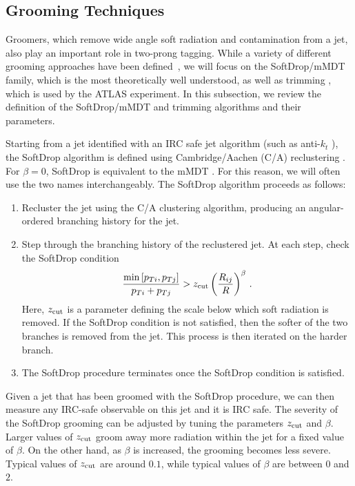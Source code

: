 \documentclass[11pt]{cernrep}
\begin{document}
\subsection{Grooming Techniques}\label{jetsub_2prong_sec:groom_tech}

Groomers, which remove wide angle soft radiation and contamination from a jet, also play an important role in two-prong tagging.
%
While a variety of different grooming approaches have been defined~\cite{Butterworth:2008iy,Ellis:2009su,Ellis:2009me,Krohn:2009th,Dasgupta:2013via,Dasgupta:2013ihk}, we will focus on the SoftDrop/mMDT family, which is the most theoretically well understood, as well as trimming \cite{Krohn:2009th}, which is used by the ATLAS experiment.
%
In this subsection, we review the definition of the SoftDrop/mMDT and trimming algorithms and their parameters.

Starting from a jet identified with an IRC safe jet algorithm (such as
anti-$k_t$ \cite{Cacciari:2008gp}), the SoftDrop algorithm is defined
using Cambridge/Aachen (C/A) reclustering
\cite{Dokshitzer:1997in,Wobisch:1998wt,Wobisch:2000dk}.
%
For $\beta = 0$, SoftDrop is equivalent to the mMDT \cite{Dasgupta:2013ihk}. For this reason, we will often use the two names interchangeably.
%
The SoftDrop algorithm proceeds as follows:
%
\begin{enumerate}
%
\item Recluster the jet using the C/A clustering algorithm, producing an angular-ordered branching history for the jet.
%
\item Step through the branching history of the reclustered jet.  At each step, check the SoftDrop condition
\begin{align}\label{jetsub_2prong_eq:sd_cut}
\frac{\min\left[ p_{Ti}, p_{Tj}  \right]}{p_{Ti}+p_{Tj}}> {z_{\rm cut}} \left(   \frac{R_{ij}}{R}\right)^\beta \,.
\end{align}
Here, ${z_{\rm cut}}$ is a parameter defining the scale below which soft radiation is removed.  If the SoftDrop condition is not satisfied, then the softer of the two branches is removed from the jet.  This process is then iterated on the harder branch.
%
\item The SoftDrop procedure terminates once the SoftDrop condition is satisfied.
%
\end{enumerate}
%
Given a jet that has been groomed with the SoftDrop procedure, we can
then measure any IRC-safe observable on this jet and it is
IRC safe.
%
The severity of the SoftDrop grooming can be adjusted by
tuning the parameters ${z_{\rm cut}}$ and $\beta$.
%
Larger values of ${z_{\rm cut}}$ groom away more radiation within the jet for a fixed value of $\beta$.
%
On the other hand, as $\beta$ is increased, the grooming becomes less
severe.
%
Typical values of ${z_{\rm cut}}$ are around $0.1$, while typical
values of $\beta$ are between $0$ and $2$.
\end{document}
